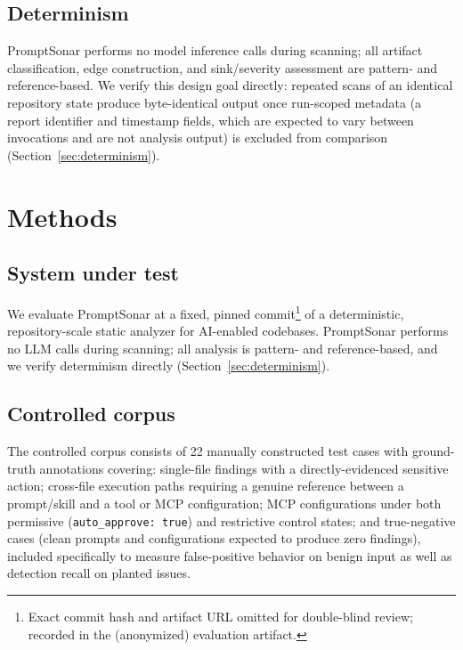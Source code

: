 \documentclass[sigconf,anonymous,review]{acmart}
\newcommand{\sysname}{PromptSonar}
\begin{document}
\subsection{Determinism}
\sysname{} performs no model inference calls during scanning; all artifact classification, edge construction, and sink/severity assessment are pattern- and reference-based. We verify this design goal directly: repeated scans of an identical repository state produce byte-identical output once run-scoped metadata (a report identifier and timestamp fields, which are expected to vary between invocations and are not analysis output) is excluded from comparison (Section~\ref{sec:determinism}).

\section{Methods}
\label{sec:methods}

\subsection{System under test}
\label{sec:sut}
We evaluate \sysname{} at a fixed, pinned commit\footnote{Exact commit hash and artifact URL omitted for double-blind review; recorded in the (anonymized) evaluation artifact.} of a deterministic, repository-scale static analyzer for AI-enabled codebases. \sysname{} performs no LLM calls during scanning; all analysis is pattern- and reference-based, and we verify determinism directly (Section~\ref{sec:determinism}).

\subsection{Controlled corpus}
\label{sec:controlled-corpus}
The controlled corpus consists of 22 manually constructed test cases with ground-truth annotations covering: single-file findings with a directly-evidenced sensitive action; cross-file execution paths requiring a genuine reference between a prompt/skill and a tool or MCP configuration; MCP configurations under both permissive (\texttt{auto\_approve: true}) and restrictive control states; and true-negative cases (clean prompts and configurations expected to produce zero findings), included specifically to measure false-positive behavior on benign input as well as detection recall on planted issues.
\end{document}
